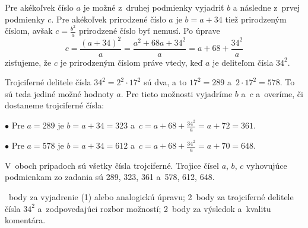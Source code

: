 {%
Pre akékoľvek číslo $a$ je možné z~druhej podmienky vyjadriť $b$ a následne z~prvej podmienky $c$.
Pre akékoľvek prirodzené číslo $a$ je $b=a+34$ tiež prirodzeným číslom, avšak $c =\frac{b^2}a$ prirodzené číslo byť nemusí.
Po úprave
$$
c %
=\frac{(a+34)^2}{a}
=\frac{a^2+68a+34^2}{a}
=a+68+\frac{34^2}{a}
\tag{1}
$$
zisťujeme, že $c$ je prirodzeným číslom práve vtedy, keď $a$ je deliteľom čísla $34^2$.

Trojciferné delitele čísla $34^2=2^2\cdot17^2$ sú dva, a to $17^2=289$ a~$2\cdot17^2=578$.
To sú teda jediné možné hodnoty $a$.
Pre tieto možnosti vyjadríme $b$ a~$c$ a~overíme, či dostaneme trojciferné čísla:

\smallskip
\item{$\bullet$} Pre $a=289$ je $b=a+34=323$ a~$c=a+68+\frac{34^2}{a}=a+72=361$.
\item{$\bullet$} Pre $a=578$ je $b=a+34=612$ a~$c=a+68+\frac{34^2}{a}=a+70=648$.

\smallskip\noindent
V~oboch prípadoch sú všetky čísla trojciferné.
Trojice čísel $a$, $b$, $c$ vyhovujúce podmienkam zo zadania sú 289, 323, 361 a~578, 612, 648.

~body za vyjadrenie (1) alebo analogickú úpravu;
2~body za trojciferné delitele čísla $34^2$ a~zodpovedajúci rozbor možností;
2~body za výsledok a~kvalitu komentára.
\endhodnotenie
}



